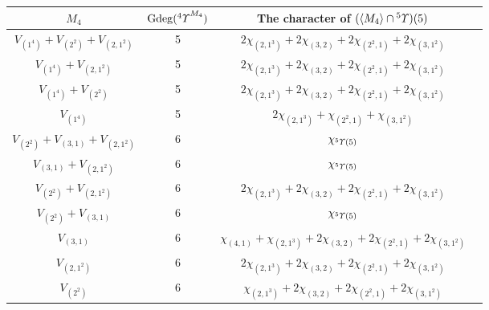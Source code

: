 \documentclass{amsart}
\theoremstyle{definition}
\theoremstyle{remark}
\numberwithin{equation}{section}
\def\gd{\operatorname{Gdeg}}
\newcommand{\up}[1]{{^{#1}{\it \!\Upsilon}}}
\begin{document}
\begin{center}
\begin{tabular}{|c|c|c|c|}
\hline
			$M_4$                             & $\gd(\up{4}^{M_4})$   & The character of $(\langle M_4\rangle\cap \up{5})(5)$ \\ \hline 
			$V_{(1^4)}+V_{(2^2)}+V_{(2,1^2)}$ & 5                     & $2\chi_{(2,1^3)}+2\chi_{(3,2)}+2\chi_{(2^2,1)}+2\chi_{(3,1^2)}$ \\ \hline 
			$V_{(1^4)}+V_{(2,1^2)}$           & 5                     & $2\chi_{(2,1^3)}+2\chi_{(3,2)}+2\chi_{(2^2,1)}+2\chi_{(3,1^2)}$ \\ \hline
			$V_{(1^4)}+V_{(2^2)}$             & 5                     & $2\chi_{(2,1^3)}+2\chi_{(3,2)}+2\chi_{(2^2,1)}+2\chi_{(3,1^2)}$ \\ \hline
			$V_{(1^4)}$                       & 5                     & $2\chi_{(2,1^3)}+\chi_{(2^2,1)}+\chi_{(3,1^2)}$ \\ \hline
			$V_{(2^2)}+V_{(3,1)}+V_{(2,1^2)}$ & 6                     & $\chi_{\up{5}(5)}$ \\ \hline
			$V_{(3,1)}+V_{(2,1^2)}$           & 6                     & $\chi_{\up{5}(5)}$  \\ \hline
			$V_{(2^2)}+V_{(2,1^2)}$           & 6                     & $2\chi_{(2,1^3)}+2\chi_{(3,2)}+2\chi_{(2^2,1)}+2\chi_{(3,1^2)}$ \\ \hline
			$V_{(2^2)}+V_{(3,1)}$             & 6                     & $\chi_{\up{5}(5)}$ \\ \hline
			$V_{(3,1)}$                       & 6                     & $\chi_{(4,1)}+\chi_{(2,1^3)}+2\chi_{(3,2)}+2\chi_{(2^2,1)}+2\chi_{(3,1^2)}$ \\ \hline
			$V_{(2,1^2)}$                     & 6                     & $2\chi_{(2,1^3)}+2\chi_{(3,2)}+2\chi_{(2^2,1)}+2\chi_{(3,1^2)}$ \\ \hline
			$V_{(2^2)}$                       & 6                     & $\chi_{(2,1^3)}+2\chi_{(3,2)}+2\chi_{(2^2,1)}+2\chi_{(3,1^2)}$  \\ \hline
		\end{tabular}
	\end{center}
\end{document}

